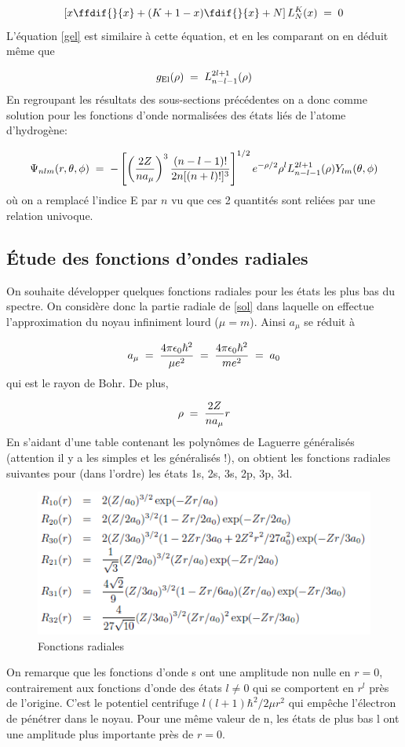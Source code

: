 \begin{equation}
    \left[x\ffdif{}{x}+(K+1-x)\fdif{}{x}+N\right] L_{N}^{K}(x)\eq 0
\end{equation}
L'équation \eqref{gel} est similaire à cette équation, et en les comparant on en déduit même que

\[
    g_\text{El}(\rho)\; = \; L_{n-l-1}^{2l+1}(\rho)
\]
En regroupant les résultats des sous-sections précédentes on a donc comme solution pour les fonctions d'onde normalisées des états liés de l'atome d'hydrogène:

\begin{equation}
    \Psi_{nlm}(r,\theta,\phi)\; = \; -\left[\left(\dfrac{2Z}{na_{\mu}}\right)^3\dfrac{(n-l-1)!}{2n[(n+l)!]^3}\right]^{1/2}e^{-\rho/2}\rho^l L_{n-l-1}^{2l+1}(\rho)Y_{lm}(\theta,\phi)
    \label{sol}
\end{equation}
où on a remplacé l'indice E par $n$ vu que ces 2 quantités sont reliées par une relation univoque. 


\subsection{Étude des fonctions d'ondes radiales}
On souhaite développer quelques fonctions radiales pour les états les plus bas du spectre. On considère donc la partie radiale de \eqref{sol} dans laquelle on effectue l'approximation du noyau infiniment lourd ($\mu=m$). Ainsi $a_\mu$ se réduit à 

\[
    a_{\mu}\; = \; \dfrac{4\pi\epsilon_0\hbar^2}{\mu e^2}\; = \; \dfrac{4\pi\epsilon_0\hbar^2}{me^2}\; = \;  a_0
\]
qui est le rayon de Bohr. De plus,

\[
    \rho\; = \; \dfrac{2Z}{n a_{\mu}}r    
\]
En s'aidant d'une table contenant les polynômes de Laguerre généralisés (attention il y a les simples et les généralisés !), on obtient les fonctions radiales suivantes pour (dans l'ordre) les états 1s, 2s, 3s, 2p, 3p, 3d.

\begin{figure}[tph]
    \centering
    \includegraphics{Images2/foncrad.PNG}
    \caption{Fonctions radiales}
    \label{fig:foncrad}
\end{figure}
On remarque que les fonctions d'onde s ont une amplitude non nulle en $r = 0$, contrairement aux fonctions
d'onde des états $l\neq 0$ qui se comportent en $r^l$ près de l'origine. C'est le potentiel centrifuge $l(l+1)\hbar^2/2\mu r^2$ qui empêche l'électron de pénétrer dans le noyau. Pour une même valeur de n, les états de plus bas l ont une amplitude plus importante près de $r = 0$.

